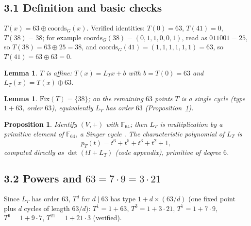 \documentclass[11pt]{article}
\newtheorem{lemma}[theorem]{Lemma}
\newtheorem{proposition}[theorem]{Proposition}
\begin{document}
\subsection*{3.1 Definition and basic checks}
$T(x)=63\oplus \mathrm{coords}_G(x)$. Verified identities:
$T(0)=63$, $T(41)=0$, $T(38)=38$; for example
$\mathrm{coords}_G(38)=(0,1,1,0,0,1)$, read as $011001=25$, so $T(38)=63\oplus25=38$,
and $\mathrm{coords}_G(41)=(1,1,1,1,1,1)=63$, so $T(41)=63\oplus63=0$.
\begin{lemma}\label{lem:aff}
$T$ is affine: $T(x)=L_Tx+b$ with $b=T(0)=63$ and $L_T(x)=T(x)\oplus 63$.
\end{lemma}
\begin{lemma}\label{lem:fix}
$\mathrm{Fix}(T)=\{38\}$; on the remaining $63$ points $T$ is a single cycle
(type $1+63$, order $63$), equivalently $L_T$ has order $63$ (Proposition~\ref{prop:singer}).
\end{lemma}
\begin{proposition}\label{prop:singer}
Identify $(V,+)$ with $\mathbb{F}_{64}$; then $L_T$ is
multiplication by a primitive element of $\mathbb{F}_{64}$, a Singer cycle \cite{LN}. The
characteristic polynomial of $L_T$ is
\begin{equation}\label{eq:pT}
p_T(t)=t^6+t^5+t^3+t^2+1,
\end{equation}
computed directly as $\det(tI+L_T)$ (code appendix), primitive of degree $6$.
\end{proposition}

\subsection*{3.2 Powers and $63=7\cdot 9=3\cdot 21$}
Since $L_T$ has order $63$, $T^d$ for $d\mid 63$ has type $1+d\times(63/d)$ (one fixed point plus $d$ cycles of length $63/d$):
$T^1=1+63$, $T^3=1+3\cdot21$, $T^7=1+7\cdot9$, $T^9=1+9\cdot7$,
$T^{21}=1+21\cdot3$ (verified).
\end{document}
